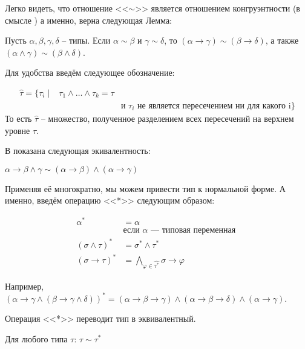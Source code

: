 \documentclass{spbau-diploma}
\begin{document}
Легко видеть, что отношение <<$\sim$>> является отношением конгруэнтности (в смысле \cite{barendregt_93}) а именно, верна следующая Лемма:
\begin{lemma}
Пусть $\alpha, \beta, \gamma, \delta$ -- типы. 
Если $\alpha \sim \beta$ и $\gamma \sim \delta$, то $(\alpha \to \gamma) \sim (\beta \to \delta)$, а также $(\alpha \wedge \gamma) \sim (\beta \wedge \delta)$.
\end{lemma}



Для удобства введём следующее обозначение: 
\begin{definition}
\begin{align*}
\hat{\tau} = \{\tau_i \mid & \tau_1 \wedge \dots \wedge \tau_k = \tau \\
                               && \text{и $\tau_i$ не является пересечением ни для какого i} \}
\end{align*}
То есть $\hat{\tau}$ -- множество, полученное разделением всех пересечений на верхнем уровне $\tau$.
\end{definition}


В \cite{hindley_82} показана следующая экивалентность: 
\begin{lemma}
$\alpha \to \beta \wedge \gamma \sim (\alpha \to \beta) \wedge (\alpha \to \gamma)$
\end{lemma}

Применяя её многократно, мы можем привести тип к нормальной форме. А именно, введём операцию <<*>> следующим образом: 

\begin{definition}
\begin{align*}
\alpha^* &= \alpha \\
    &\text{если $\alpha$ --- типовая переменная }\\
(\sigma \wedge \tau)^* &= \sigma^* \wedge \tau^*\\
(\sigma \to \tau)^* &= \bigwedge \limits_{\varphi \in \hat{\tau^*}} \sigma \to \varphi
\end{align*}
\end{definition}

Например, $(\alpha \to \gamma \wedge (\beta \to \gamma \wedge \delta))^* = (\alpha \to \beta \to \gamma) \wedge (\alpha \to \beta \to \delta) \wedge (\alpha \to \gamma)$.

Операция <<*>> переводит тип в эквивалентный.

\begin{lemma} \label{normal form}
Для любого типа $\tau$: $\tau \sim \tau^*$
\end{lemma}
\end{document}
